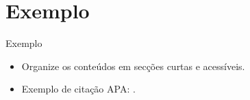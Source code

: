 \section{Exemplo}
\begin{frame}{Exemplo}
  \begin{itemize}
    \item Organize os conteúdos em secções curtas e acessíveis.
    \item Exemplo de citação APA: \parencite{ipbeja_normas_trabalhos_2024}.
  \end{itemize}
\end{frame}
